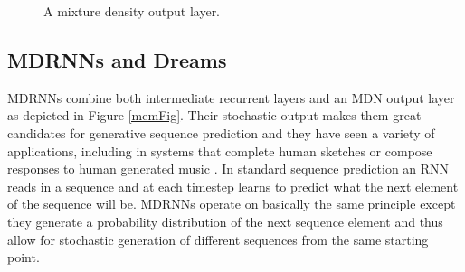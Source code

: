 \documentclass{article}
\numberwithin{figure}{section}
\theoremstyle{definition}
\begin{document}
\begin{figure}
\caption{A mixture density output layer. }
\end{figure}

\subsection{MDRNNs and Dreams}

MDRNNs combine both intermediate recurrent layers and an MDN output layer as depicted in Figure \ref{memFig}. 
Their stochastic output makes them great candidates for generative sequence prediction and they have seen a variety of applications, including in systems that complete human sketches \citep{ha2017neural} or compose responses to human generated music \citep{martin2018robojam}.
In standard sequence prediction an RNN reads in a sequence and at each timestep learns to predict what the next element of the sequence will be.
MDRNNs operate on basically the same principle except they generate a probability distribution of the next sequence element and thus allow for stochastic generation of different sequences from the same starting point.

\end{document}
